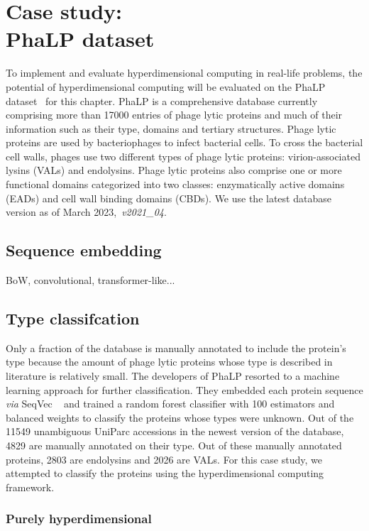 \chapter[Case study: PhaLP dataset]{Case study: \\PhaLP dataset}
To implement and evaluate hyperdimensional computing in real-life problems, the potential of hyperdimensional computing will be evaluated on the PhaLP dataset~\cite{phalp} for this chapter. PhaLP is a comprehensive database currently comprising more than 17000 entries of phage lytic proteins and much of their information such as their type, domains and tertiary structures. Phage lytic proteins are used by bacteriophages to infect bacterial cells. To cross the bacterial cell walls, phages use two different types of phage lytic proteins: virion-associated lysins (VALs) and endolysins. Phage lytic proteins also comprise one or more functional domains categorized into two classes: enzymatically active domains (EADs) and cell wall binding domains (CBDs). We use the latest database version as of March 2023,~\textit{v2021\_04}.

\section{Sequence embedding}
BoW, convolutional, transformer-like...

\section{Type classifcation}
Only a fraction of the database is manually annotated to include the protein's type because the amount of phage lytic proteins whose type is described in literature is relatively small. The developers of PhaLP resorted to a machine learning approach for further classification. They embedded each protein sequence \textit{via} SeqVec ~\cite{SeqVeq} and trained a random forest classifier with 100 estimators and balanced weights to classify the proteins whose types were unknown. Out of the 11549 unambiguous UniParc accessions in the newest version of the database, 4829 are manually annotated on their type. Out of these manually annotated proteins, 2803 are endolysins and 2026 are VALs. For this case study, we attempted to classify the proteins using the hyperdimensional computing framework.

\subsection{Purely hyperdimensional}
